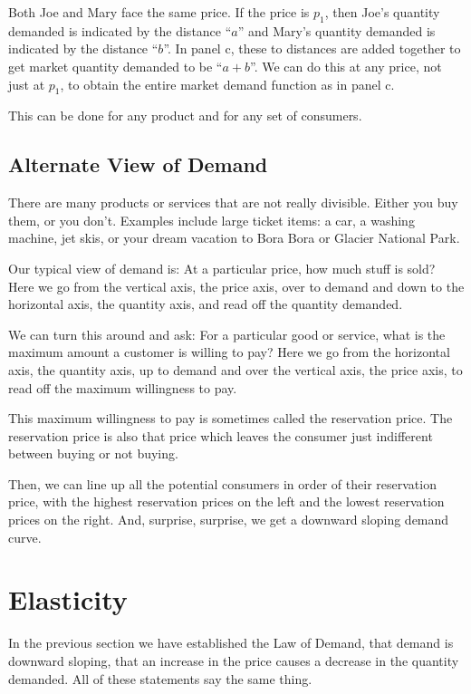 \documentclass[
]{book}
\begin{document}
Both Joe and Mary face the same price. If the price is \(p_1\), then Joe's quantity demanded is indicated by the distance ``\(a\)'' and Mary's quantity demanded is indicated by the distance ``\(b\)''. In panel c, these to distances are added together to get market quantity demanded to be ``\(a+b\)''. We can do this at any price, not just at \(p_1\), to obtain the entire market demand function as in panel c.

This can be done for any product and for any set of consumers.

\hypertarget{alternate-view-of-demand}{%
\subsection{Alternate View of Demand}\label{alternate-view-of-demand}}

There are many products or services that are not really divisible. Either you buy them, or you don't. Examples include large ticket items: a car, a washing machine, jet skis, or your dream vacation to Bora Bora or Glacier National Park.

Our typical view of demand is: At a particular price, how much stuff is sold? Here we go from the vertical axis, the price axis, over to demand and down to the horizontal axis, the quantity axis, and read off the quantity demanded.

We can turn this around and ask: For a particular good or service, what is the maximum amount a customer is willing to pay? Here we go from the horizontal axis, the quantity axis, up to demand and over the vertical axis, the price axis, to read off the maximum willingness to pay.

This maximum willingness to pay is sometimes called the reservation price. The reservation price is also that price which leaves the consumer just indifferent between buying or not buying.

Then, we can line up all the potential consumers in order of their reservation price, with the highest reservation prices on the left and the lowest reservation prices on the right. And, surprise, surprise, we get a downward sloping demand curve.

\hypertarget{elasticity}{%
\section{Elasticity}\label{elasticity}}

In the previous section we have established the Law of Demand, that demand is downward sloping, that an increase in the price causes a decrease in the quantity demanded. All of these statements say the same thing.
\end{document}
